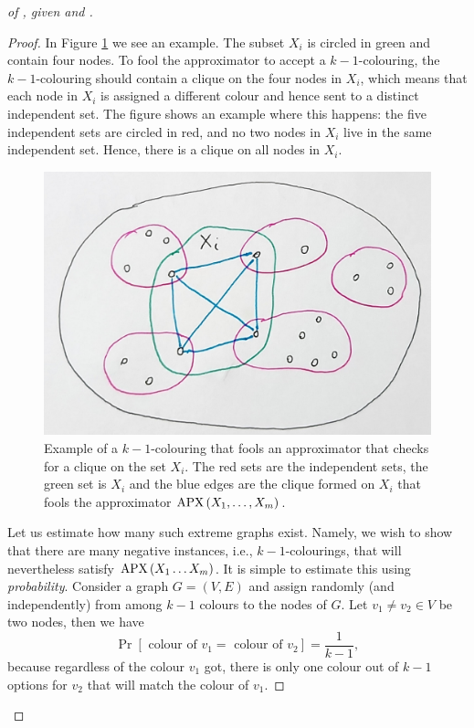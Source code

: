 \begin{proof}[of , given   and ]
\begin{proof}
In Figure \ref{fig:R(xi)}  we see an example. The subset $X_i$ is circled in green and contain four nodes. To fool the approximator to accept a $k-1$-colouring, the $k-1$-colouring should contain a clique on the four nodes in $X_i$, which means that each node in $X_i$ is assigned a different colour and hence sent to a distinct independent set. The figure shows an example where this happens: the five independent sets are circled in red, and no two nodes in $X_i$ live in the same independent set. Hence, there is a clique on all nodes in $X_i$.
\begin{figure}[H] 
    \centering
    \includegraphics[scale=0.35]{images/R(Xi)-lemma-cliques.png}
        \caption{Example of a $k-1$-colouring that fools an approximator that checks for a clique on  the set $X_i$. The red sets are the independent sets, the green set is $X_i$ and the blue edges are the clique formed on $X_i$ that fools the approximator $\operatorname{\mathrm{APX}}\left(X_1, \ldots, X_m\right)$.}
    \label{fig:R(xi)}
\end{figure}

Let us  estimate  how many such extreme graphs exist. 
Namely, we wish to show that there are many negative instances, i.e., $k-1$-colourings, that will nevertheless satisfy  
$\operatorname{\mathrm{APX}}\left(X_1 \ldots X_m\right)$.
It is simple to estimate this using \emph{probability}. Consider a graph $G=(V, E)$ and  assign randomly (and independently) from among $k-1$ colours to the nodes of $G$. Let $v_1 \neq v_2 \in V$ be two nodes, then we  have
$$
\operatorname{Pr}\left[\text { colour of } v_1=\text { colour of } v_2\right]=\frac{1}{k-1},
$$
because regardless of the colour $v_1$ got, there is only one colour out of $k-1$ options for $v_2$ that will match the colour of $v_1$.


\end{proof}
\end{proof}
